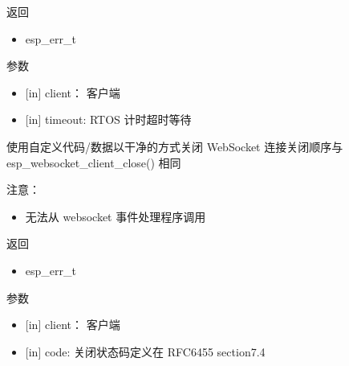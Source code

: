 \documentclass[a4paper,12pt,english]{sphinxmanual}
\begin{document}
{{\begin{itemize}
\end{itemize}

\sphinxAtStartPar
返回
\begin{itemize}
\item {} 
\sphinxAtStartPar
esp\_err\_t

\end{itemize}

\sphinxAtStartPar
参数
\begin{itemize}
\item {} 
\sphinxAtStartPar
{[}in{]} client： 客户端

\item {} 
\sphinxAtStartPar
{[}in{]} timeout: RTOS 计时超时等待

\end{itemize}

\begin{sphinxVerbatim}[commandchars=\\\{\}]
\end{sphinxVerbatim}

\sphinxAtStartPar
使用自定义代码/数据以干净的方式关闭 WebSocket 连接关闭顺序与 esp\_websocket\_client\_close() 相同

\sphinxAtStartPar
注意：
\begin{itemize}
\item {} 
\sphinxAtStartPar
无法从 websocket 事件处理程序调用

\end{itemize}

\sphinxAtStartPar
返回
\begin{itemize}
\item {} 
\sphinxAtStartPar
esp\_err\_t

\end{itemize}

\sphinxAtStartPar
参数
\begin{itemize}
\item {} 
\sphinxAtStartPar
{[}in{]} client： 客户端

\item {} 
\sphinxAtStartPar
{[}in{]} code: 关闭状态码定义在 RFC6455 section\sphinxhyphen{}7.4


\end{itemize}}}
\end{document}
